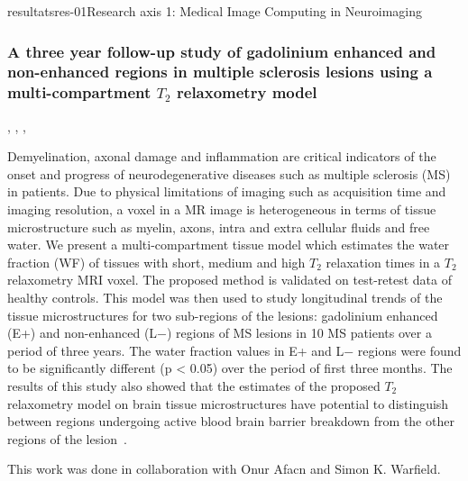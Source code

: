 \documentclass{ra2018}
\begin{document}
\begin{module}{resultats}{res-01}{Research axis 1: Medical Image Computing in Neuroimaging}
\subsubsection{A three year follow-up study of gadolinium enhanced and non-enhanced regions in multiple sclerosis lesions using a multi-compartment $T_2$ relaxometry model}
\begin{participants}
      , 
      ,
      ,
\end{participants}
Demyelination, axonal damage and inflammation are critical indicators of the onset and progress of neurodegenerative diseases such as multiple sclerosis (MS) in patients. Due to physical limitations of imaging such as acquisition time and imaging resolution, a voxel in a MR image is heterogeneous in terms of tissue microstructure such as myelin, axons, intra and extra cellular fluids and free water. We present a multi-compartment tissue model which estimates the water fraction (WF) of tissues with short, medium and high $T_2$ relaxation times in a $T_2$ relaxometry MRI voxel. The proposed method is validated on test-retest data of healthy controls. This model was then used to study longitudinal trends of the tissue microstructures for two sub-regions of the lesions: gadolinium enhanced (E+) and non-enhanced (L−) regions of MS lesions in 10 MS patients over a period of three years. The water fraction values in E+ and L− regions were found to be significantly different (p < 0.05) over the period of first three months. The results of this study also showed that the estimates of the proposed $T_2$ relaxometry model on brain tissue microstructures have potential to distinguish between regions undergoing active blood brain barrier breakdown from the other regions of the lesion~\cite{chatterjee:hal-01837974}.

This work was done in collaboration with Onur Afacn and Simon K. Warfield.


\end{module}
\end{document}
